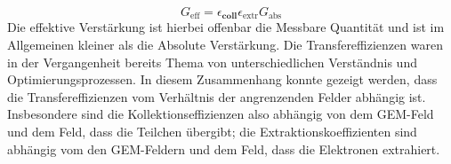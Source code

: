 \begin{equation}
	G_{\text{eff}}= \epsilon_{\textbf{coll}} \epsilon_{\text{extr}} G_{\text{abs}}
\end{equation}
Die effektive Verstärkung ist hierbei offenbar die Messbare Quantität und ist im Allgemeinen kleiner als die Absolute Verstärkung. Die Transfereffizienzen waren in der Vergangenheit bereits Thema von unterschiedlichen Verständnis und Optimierungsprozessen. In diesem Zusammenhang konnte gezeigt werden, dass die Transfereffizienzen vom Verhältnis der angrenzenden Felder abhängig ist. Insbesondere sind die Kollektionseffizienzen also abhängig von dem GEM-Feld und dem Feld, dass die Teilchen übergibt; die Extraktionskoeffizienten sind abhängig vom den GEM-Feldern und dem Feld, dass die Elektronen extrahiert.